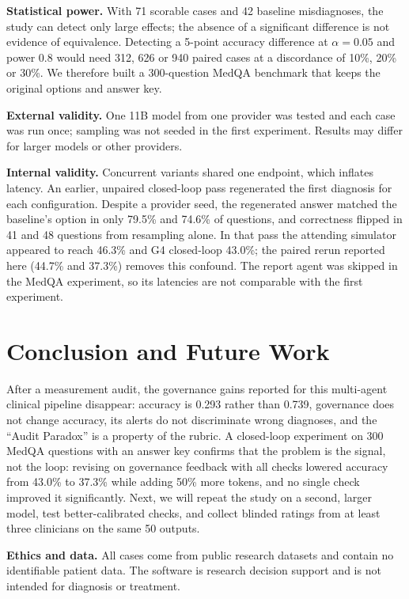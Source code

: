 \documentclass[conference]{IEEEtran}
\begin{document}
\textbf{Statistical power.} With 71 scorable cases and 42 baseline misdiagnoses, the study can detect only large
effects; the absence of a significant difference is not evidence of equivalence. Detecting a 5-point accuracy
difference at $\alpha = 0.05$ and power 0.8 would need 312, 626 or 940 paired cases at a discordance of 10\%, 20\% or %
30\%. We therefore built a 300-question MedQA benchmark that keeps the original options and answer key.

\textbf{External validity.} One 11B model from one provider was tested and each case was run once; sampling was not
seeded in the first experiment. Results may differ for larger models or other providers.

\textbf{Internal validity.} Concurrent variants shared one endpoint, which inflates latency. An earlier, unpaired
closed-loop pass regenerated the first diagnosis for each configuration. Despite a provider seed, the regenerated
answer matched the baseline's option in only 79.5\% and 74.6\% of questions, and correctness flipped in 41 and 48
questions from resampling alone. In that pass the attending simulator appeared to reach 46.3\% and G4 closed-loop
43.0\%; the paired rerun reported here (44.7\% and 37.3\%) removes this confound. The report agent was skipped in
the MedQA experiment, so its latencies are not comparable with the first experiment.

\section{Conclusion and Future Work}
After a measurement audit, the governance gains reported for this multi-agent clinical pipeline disappear:
accuracy is 0.293 rather than 0.739, governance does not change accuracy, its alerts do not discriminate wrong
diagnoses, and the ``Audit Paradox'' is a property of the rubric. A closed-loop experiment on 300 MedQA questions
with an answer key confirms that the problem is the signal, not the loop: revising on governance feedback with all
checks lowered accuracy from 43.0\% to 37.3\% while adding 50\% more tokens, and no single check improved it
significantly. Next, we will repeat the study on a second, larger model, test better-calibrated checks, and collect blinded
ratings from at least three clinicians on the same 50 outputs.

\textbf{Ethics and data.} All cases come from public research datasets and contain no identifiable patient data. The
software is research decision support and is not intended for diagnosis or treatment.
\end{document}

